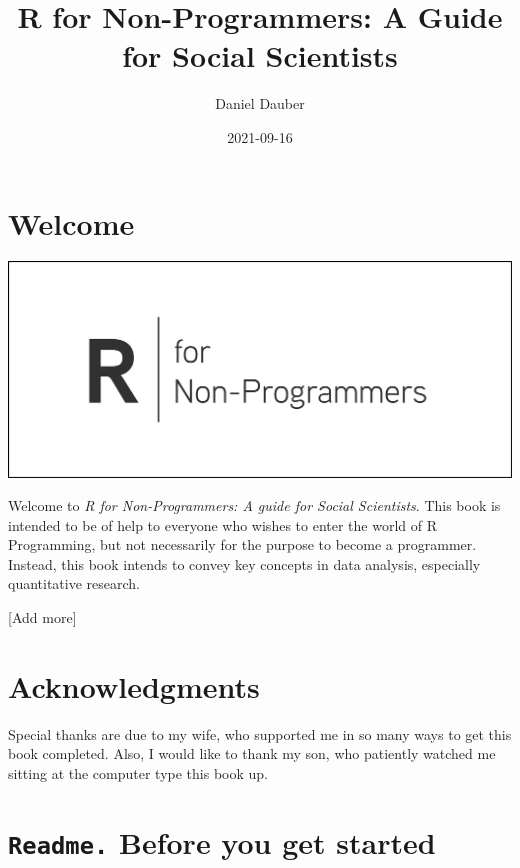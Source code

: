 \documentclass[
]{book}
\title{R for Non-Programmers: A Guide for Social Scientists}
\author{Daniel Dauber}
\date{2021-09-16}
\begin{document}
\maketitle

{
\setcounter{tocdepth}{1}
\tableofcontents
}
\hypertarget{welcome}{%
\chapter*{Welcome 👋}\label{welcome}}

\includegraphics{images/chapter_00_img/r_for_non_programmers_logo.png}

Welcome to \emph{R for Non-Programmers: A guide for Social Scientists}. This book is intended to be of help to everyone who wishes to enter the world of R Programming, but not necessarily for the purpose to become a programmer. Instead, this book intends to convey key concepts in data analysis, especially quantitative research.

{[}Add more{]}

\hypertarget{acknowledgments}{%
\chapter*{Acknowledgments 🙏}\label{acknowledgments}}

Special thanks are due to my wife, who supported me in so many ways to get this book completed. Also, I would like to thank my son, who patiently watched me sitting at the computer type this book up.

\hypertarget{readme-before-you-get-started}{%
\chapter{\texorpdfstring{\texttt{Readme.} Before you get started}{Readme. Before you get started}}\label{readme-before-you-get-started}}
\end{document}
